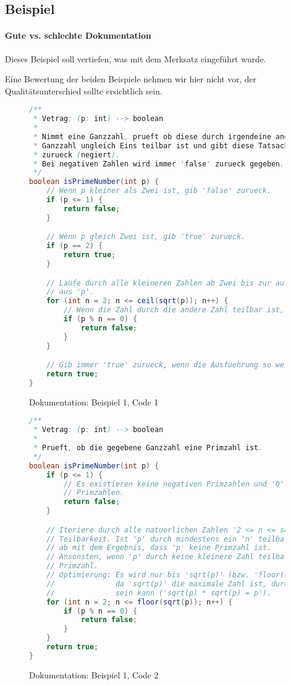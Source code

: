 \subsection{Beispiel}
	\paragraph{Gute vs. schlechte Dokumentation}
		Dieses Beispiel soll vertiefen, was mit dem Merksatz eingeführt wurde.
		
		Eine Bewertung der beiden Beispiele nehmen wir hier nicht vor, der Qualitätsunterschied sollte ersichtlich sein.
		
		\begin{figure}[H]
			\centering
			\begin{lstlisting}[language = Java, style = base]
/**
 * Vetrag: (p: int) --> boolean
 *
 * Nimmt eine Ganzzahl, prueft ob diese durch irgendeine andere, kleinere,
 * Ganzzahl ungleich Eins teilbar ist und gibt diese Tatsache als Wahrheitswert
 * zurueck (negiert).
 * Bei negativen Zahlen wird immer 'false' zurueck gegeben.
 */
boolean isPrimeNumber(int p) {
	// Wenn p kleiner als Zwei ist, gib 'false' zurueck.
	if (p <= 1) {
		return false;
	}

	// Wenn p gleich Zwei ist, gib 'true' zurueck.
	if (p == 2) {
		return true;
	}

	// Laufe durch alle kleineren Zahlen ab Zwei bis zur aufgerundeten Wurzel
	// aus 'p'.
	for (int n = 2; n <= ceil(sqrt(p)); n++) {
		// Wenn die Zahl durch die andere Zahl teilbar ist, gib 'false' zurueck.
		if (p % n == 0) {
			return false;
		}
	}

	// Gib immer 'true' zurueck, wenn die Ausfuehrung so weit kommt.
	return true;
}
			\end{lstlisting}
			\caption{Dokumentation: Beispiel 1, Code 1}
		\end{figure}

		\begin{figure}[H]
			\centering
			\begin{lstlisting}[language = Java, style = base]
/**
 * Vetrag: (p: int) --> boolean
 *
 * Prueft, ob die gegebene Ganzzahl eine Primzahl ist.
 */
boolean isPrimeNumber(int p) {
	if (p <= 1) {
		// Es existieren keine negativen Primzahlen und '0', '1' sind keine
		// Primzahlen.
		return false;
	}

	// Iteriere durch alle natuerlichen Zahlen '2 <= n <= sqrt(p)' und pruefe auf
	// Teilbarkeit. Ist 'p' durch mindestens ein 'n' teilbar, breche den Test
	// ab mit dem Ergebnis, dass 'p' keine Primzahl ist.
	// Ansonsten, wenn 'p' durch keine kleinere Zahl teilbar ist, ist 'p' eine
	// Primzahl.
	// Optimierung: Es wird nur bis 'sqrt(p)' (bzw. 'floor(sqrt(p))') gelaufen,
	//              da 'sqrt(p)' die maximale Zahl ist, durch die 'p' teilbar
	//              sein kann ('sqrt(p) * sqrt(p) = p').
	for (int n = 2; n <= floor(sqrt(p)); n++) {
		if (p % n == 0) {
			return false;
		}
	}
	return true;
}
			\end{lstlisting}
			\caption{Dokumentation: Beispiel 1, Code 2}
		\end{figure}
